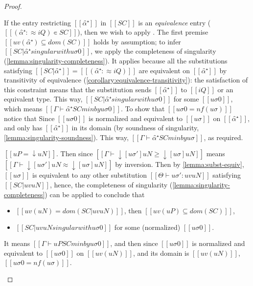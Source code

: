 \begin{proof}
\begin{caseof}
            If the entry restricting $[[α̂⁺]]$ in $[[SC]]$ is an \emph{equivalence} entry
            ($[[(α̂⁺ :≈ iQ) ∊ SC]]$), then we wish to apply
            .
            The first premise $[[uv(α̂⁺) ⊆ dom(SC)]]$  
            holds by assumption;
            to infer $[[SC|{α̂⁺} singular with uσ0]]$, 
            we apply the completeness of singularity (\cref{lemma:singularity-completeness}).
            It applies because all the substitutions satisfying $[[SC|{α̂⁺}]] = [[(α̂⁺ :≈ iQ)]]$
            are equivalent on $[[{α̂⁺}]]$ by transitivity of equivalence 
            (\cref{corollary:equivalence-transitivity}): 
            the satisfaction of this constraint means that the substitution 
            sends $[[α̂⁺]]$ to $[[iQ]]$ or an equivalent type.
            This way, $[[SC|{α̂⁺} singular with uσ0]]$ for some $[[uσ0]]$,
            which means $[[Γ ⊢ α̂⁺ SC minby uσ0]]$.
            To show that $[[uσ0 = nf(uσ)]]$ notice that 
            Since $[[uσ0]]$ is normalized and equivalent to $[[uσ]]$ on $[[{α̂⁺}]]$, 
            and only has $[[α̂⁺]]$ in its domain
            (by soundness of singularity, \cref{lemma:singularity-soundness}).
            This way, $[[Γ ⊢ α̂⁺ SC minby uσ]]$, as required.
        \item  \label{case:min-inst-completeness-down}
            $[[uP = ↓uN]]$. Then since
            $[[Γ ⊢ ↓[uσ']uN ≥ ↓[uσ]uN ]]$ means
            $[[Γ ⊢ ↓[uσ']uN ≈ ↓[uσ]uN ]]$ by inversion.
            Then by \cref{lemma:subst-equiv}, 
            $[[uσ]]$ is equivalent to any other substitution 
            $[[Θ ⊢ uσ' : uv uN ]]$ satisfying $[[SC|uv uN]]$,
            hence, the completeness of singularity (\cref{lemma:singularity-completeness})
            can be applied to conclude that
            \begin{itemize}
                \item $[[uv(uN) = dom(SC|uv uN)]]$, then $[[uv(uP) ⊆ dom(SC)]]$,
                \item $[[SC|uv uN singular with uσ0]]$ for some (normalized) $[[uσ0]]$.
            \end{itemize}
            It means $[[Γ ⊢ uP SC minby uσ0 ]]$, and then
            since $[[uσ0]]$ is normalized and equivalent to $[[uσ0]]$ on $[[uv(uN)]]$,
            and its domain is $[[uv(uN)]]$, $[[uσ0 = nf(uσ)]]$.

\end{caseof}
\end{proof}
